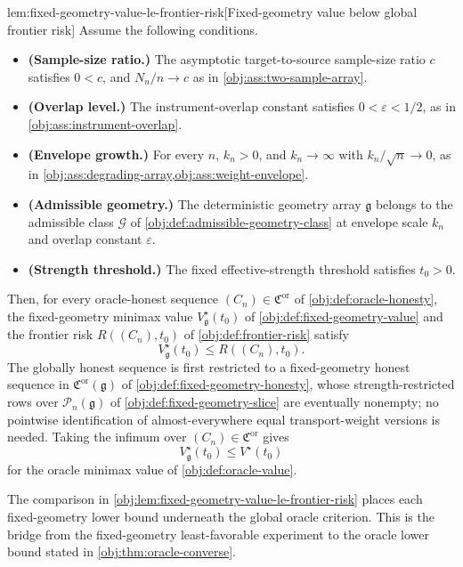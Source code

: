 \begin{lemmav}{lem:fixed-geometry-value-le-frontier-risk}[Fixed-geometry value below global frontier risk]
Assume the following conditions.
\begin{itemize}
\item \textbf{(Sample-size ratio.)} The asymptotic target-to-source sample-size ratio \(c\) satisfies \(0<c\), and \(N_n/n\to c\) as in \cref{obj:ass:two-sample-array}.
\item \textbf{(Overlap level.)} The instrument-overlap constant satisfies \(0<\varepsilon<1/2\), as in \cref{obj:ass:instrument-overlap}.
\item \textbf{(Envelope growth.)} For every \(n\), \(k_n>0\), and \(k_n\to\infty\) with \(k_n/\sqrt n\to0\), as in \cref{obj:ass:degrading-array,obj:ass:weight-envelope}.
\item \textbf{(Admissible geometry.)} The deterministic geometry array \(\mathfrak g\) belongs to the admissible class \(\mathcal G\) of \cref{obj:def:admissible-geometry-class} at envelope scale \(k_n\) and overlap constant \(\varepsilon\).
\item \textbf{(Strength threshold.)} The fixed effective-strength threshold satisfies \(t_0>0\).
\end{itemize}
Then, for every oracle-honest sequence \((C_n)\in\mathfrak C^{\mathrm{or}}\) of \cref{obj:def:oracle-honesty}, the fixed-geometry minimax value \(V_{\mathfrak g}^\star(t_0)\) of \cref{obj:def:fixed-geometry-value} and the frontier risk \(R((C_n),t_0)\) of \cref{obj:def:frontier-risk} satisfy
\[
V_{\mathfrak g}^\star(t_0)\le R((C_n),t_0).
\]
The globally honest sequence is first restricted to a fixed-geometry honest sequence in \(\mathfrak C^{\mathrm{or}}(\mathfrak g)\) of \cref{obj:def:fixed-geometry-honesty}, whose strength-restricted rows over \(\mathcal P_n(\mathfrak g)\) of \cref{obj:def:fixed-geometry-slice} are eventually nonempty; no pointwise identification of almost-everywhere equal transport-weight versions is needed. Taking the infimum over \((C_n)\in\mathfrak C^{\mathrm{or}}\) gives
\[
V_{\mathfrak g}^\star(t_0)\le V^\star(t_0)
\]
for the oracle minimax value of \cref{obj:def:oracle-value}.
\end{lemmav}

The comparison in \cref{obj:lem:fixed-geometry-value-le-frontier-risk} places each fixed-geometry lower bound underneath the global oracle criterion. This is the bridge from the fixed-geometry least-favorable experiment to the oracle lower bound stated in \cref{obj:thm:oracle-converse}.

